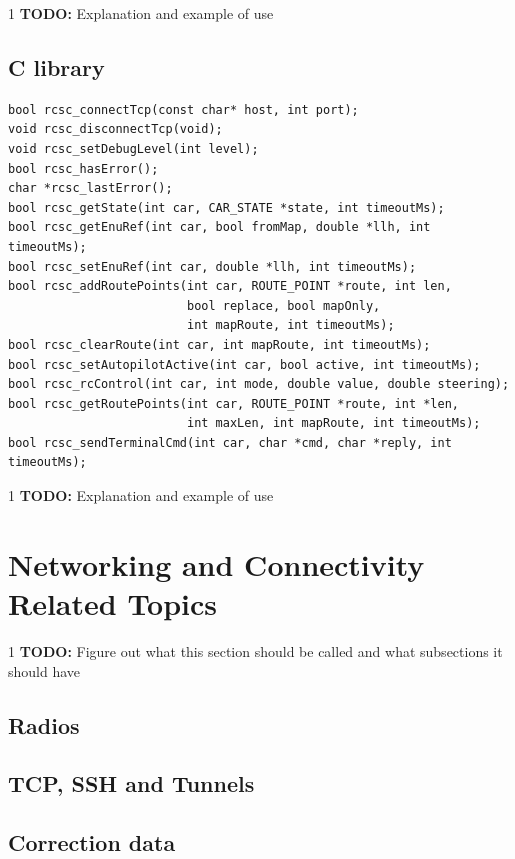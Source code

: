 \documentclass[12pt]{article} %
\def\printtodos{0}
\newcommand{\todo}[1]{
  \if\printtodos1
      {\color{red} \textbf{TODO:} #1}
  \fi}
\begin{document}
\todo{Explanation and example of use} 


\subsection{C library}

\begin{Verbatim}
bool rcsc_connectTcp(const char* host, int port);
void rcsc_disconnectTcp(void);
void rcsc_setDebugLevel(int level);
bool rcsc_hasError();
char *rcsc_lastError();
bool rcsc_getState(int car, CAR_STATE *state, int timeoutMs);
bool rcsc_getEnuRef(int car, bool fromMap, double *llh, int timeoutMs);
bool rcsc_setEnuRef(int car, double *llh, int timeoutMs);
bool rcsc_addRoutePoints(int car, ROUTE_POINT *route, int len,
                         bool replace, bool mapOnly,
                         int mapRoute, int timeoutMs);
bool rcsc_clearRoute(int car, int mapRoute, int timeoutMs);
bool rcsc_setAutopilotActive(int car, bool active, int timeoutMs);
bool rcsc_rcControl(int car, int mode, double value, double steering);
bool rcsc_getRoutePoints(int car, ROUTE_POINT *route, int *len,
                         int maxLen, int mapRoute, int timeoutMs);
bool rcsc_sendTerminalCmd(int car, char *cmd, char *reply, int timeoutMs);
\end{Verbatim} 


\todo{Explanation and example of use} 


\section{Networking and Connectivity Related Topics}

\todo{Figure out what this section should be called and what subsections it should have}

\subsection{Radios} 

\subsection{TCP, SSH and Tunnels}

\subsection{Correction data}
\end{document}
